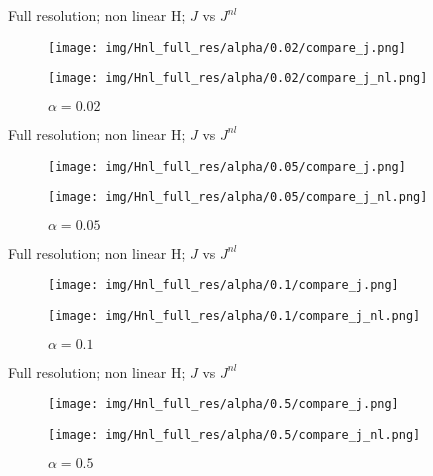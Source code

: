 \documentclass[francais]{beamer}
\begin{document}
\begin{frame}{Full resolution; non linear H; $J$ vs $J^{nl}$}
\begin{center}
\begin{figure}
  \texttt{[image: img/Hnl\_full\_res/alpha/0.02/compare\_j.png]}
  \caption{$\alpha = 0.02$}
\endminipage\hfill
{}
  \texttt{[image: img/Hnl\_full\_res/alpha/0.02/compare\_j\_nl.png]}
  \caption{$\alpha = 0.02$}
\endminipage
\end{figure}
\end{center}
\end{frame}

\begin{frame}{Full resolution; non linear H; $J$ vs $J^{nl}$}
\begin{center}
\begin{figure}
  \texttt{[image: img/Hnl\_full\_res/alpha/0.05/compare\_j.png]}
  \caption{$\alpha = 0.05$}
\endminipage\hfill
{}
  \texttt{[image: img/Hnl\_full\_res/alpha/0.05/compare\_j\_nl.png]}
  \caption{$\alpha = 0.05$}
\endminipage
\end{figure}
\end{center}
\end{frame}

\begin{frame}{Full resolution; non linear H; $J$ vs $J^{nl}$}
\begin{center}
\begin{figure}
  \texttt{[image: img/Hnl\_full\_res/alpha/0.1/compare\_j.png]}
  \caption{$\alpha = 0.1$}
\endminipage\hfill
{}
  \texttt{[image: img/Hnl\_full\_res/alpha/0.1/compare\_j\_nl.png]}
  \caption{$\alpha = 0.1$}
\endminipage
\end{figure}
\end{center}
\end{frame}

\begin{frame}{Full resolution; non linear H; $J$ vs $J^{nl}$}
\begin{center}
\begin{figure}
  \texttt{[image: img/Hnl\_full\_res/alpha/0.5/compare\_j.png]}
  \caption{$\alpha = 0.5$}
\endminipage\hfill
{}
  \texttt{[image: img/Hnl\_full\_res/alpha/0.5/compare\_j\_nl.png]}
  \caption{$\alpha = 0.5$}
\endminipage
\end{figure}
\end{center}
\end{frame}
\end{document}
